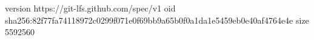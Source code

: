version https://git-lfs.github.com/spec/v1
oid sha256:82f77fa74118972c0299f071e0f69bb9a65b0f0a1da1e5459eb0e40af4764e4e
size 5592560
